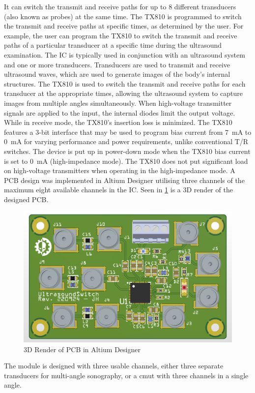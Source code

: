 It can switch the transmit and receive paths for up to 8 different transducers (also known as probes) at the same time. The TX810 is programmed to switch the transmit and receive paths at specific times, as determined by the user. For example, the user can program the TX810 to switch the transmit and receive paths of a particular transducer at a specific time during the ultrasound examination. The IC is typically used in conjunction with an ultrasound system and one or more transducers. Transducers are used to transmit and receive ultrasound waves, which are used to generate images of the body's internal structures. The TX810 is used to switch the transmit and receive paths for each transducer at the appropriate times, allowing the ultrasound system to capture images from multiple angles simultaneously. When high-voltage transmitter signals are applied to the input, the internal diodes limit the output voltage. While in receive mode, the TX810's insertion loss is minimized. The TX810 features a 3-bit interface that may be used to program bias current from \qty{7}{\milli\ampere} to \qty{0}{\milli\ampere} for varying performance and power requirements, unlike conventional T/R switches. The device is put up in power-down mode when the TX810 bias current is set to \qty{0}{\milli\ampere} (high-impedance mode). The TX810 does not put significant load on high-voltage transmitters when operating in the high-impedance mode. A PCB design was implemented in Altium Designer\cite{altium} utilising three channels of the maximum eight available channels in the IC. Seen in \cref{fig:3_ultrasoundswitch} is a 3D render of the designed PCB.
\begin{figure}[htbp]
	\centering
	\includegraphics[width=.8\textwidth]{Figures/3_ultrasoundswitch.png}
	\caption{3D Render of PCB in Altium Designer}
	\label{fig:3_ultrasoundswitch}
\end{figure}
The module is designed with three usable channels, either three separate transducers for multi-angle sonography, or a \gls{cmut} with three channels in a single angle.

